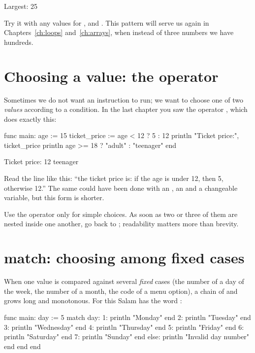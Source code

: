\begin{salamout}
Largest: 25
\end{salamout}

Try it with any values for ,  and . This pattern
will serve us again in Chapters~\ref{ch:loops} and~\ref{ch:arrays}, when
instead of three numbers we have hundreds.

\section{Choosing a value: the \texorpdfstring{}{?} operator}

Sometimes we do not want an instruction to run; we want to choose one of two
\emph{values} according to a condition. In the last chapter you saw the
operator , which does exactly this:

\begin{salamcode}
func main:
    age := 15
    ticket_price := age < 12 ? 5 : 12
    println "Ticket price:", ticket_price
    println age >= 18 ? "adult" : "teenager"
end
\end{salamcode}

\begin{salamout}
Ticket price: 12
teenager
\end{salamout}

Read the line  like this: ``the
ticket price is: if the age is under 12, then 5, otherwise 12.'' The same
could have been done with an , an  and a changeable
variable, but this form is shorter.

\begin{tip}
Use the  operator only for simple choices. As soon as two or three
of them are nested inside one another, go back to ; readability
matters more than brevity.
\end{tip}

\section{match: choosing among fixed cases}

When one value is compared against several \emph{fixed} cases (the number of
a day of the week, the number of a month, the code of a menu option), a
chain of  and  grows long and monotonous. For this
Salam has the word :

\begin{salamcode}
func main:
    day := 5
    match day:
        1: println "Monday" end
        2: println "Tuesday" end
        3: println "Wednesday" end
        4: println "Thursday" end
        5: println "Friday" end
        6: println "Saturday" end
        7: println "Sunday" end
        else: println "Invalid day number" end
    end
end
\end{salamcode}

